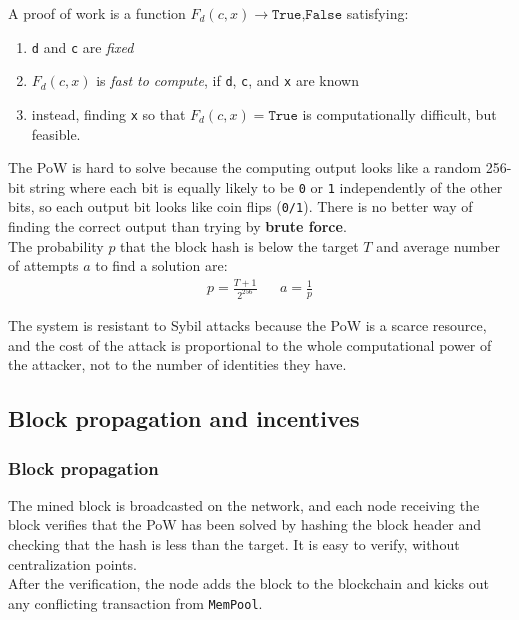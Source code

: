 \begin{definition}
   A proof of work is a function $F_d(c,x) \rightarrow {\texttt{True,False}}$ satisfying:
   \begin{enumerate}
      \item \texttt{d} and \texttt{c} are \textit{fixed}
      \item $F_d(c,x)$ is \textit{fast to compute}, if \texttt{d}, \texttt{c}, and \texttt{x} are known
      \item instead, finding \texttt{x} so that $F_d(c,x) = \texttt{True}$ is computationally difficult, but feasible.
   \end{enumerate}
\end{definition}

The PoW is hard to solve because the computing output looks like a random 256-bit string where each bit is equally likely to be \texttt{0} or \texttt{1} independently of the other bits, so each output bit looks like coin flips (\texttt{0/1}).
There is no better way of finding the correct output than trying by \textbf{brute force}.\\
The probability $p$ that the block hash is below the target $T$ and average number of attempts $a$ to find a solution are:
\begin{align*}
   p=\frac{T+1}{2^{256}} & & a=\frac{1}{p}
\end{align*}

The system is resistant to Sybil attacks because the PoW is a scarce resource, and the cost of the attack is proportional to the whole computational power of the attacker, not to the number of identities they have.


\subsection{Block propagation and incentives}
\subsubsection{Block propagation}
The mined block is broadcasted on the network, and each node receiving the block verifies that the PoW has been solved by hashing the block header and checking that the hash is less than the target.
It is easy to verify, without centralization points.\\
After the verification, the node adds the block to the blockchain and kicks out any conflicting transaction from \texttt{MemPool}.

